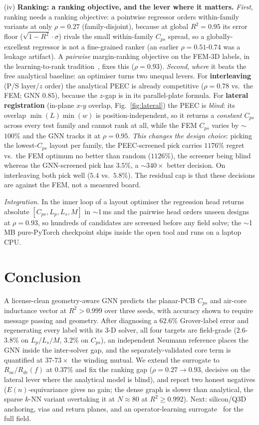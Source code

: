 \documentclass[letterpaper,twocolumn,9pt]{extarticle}
\begin{document}
(iv) \textbf{Ranking: a ranking objective, and the lever where it matters.}
\emph{First}, ranking needs a ranking objective: a pointwise regressor orders
within-family variants at only $\rho=0.27$ (family-disjoint), because at global
$R^2=0.95$ its error floor ($\sqrt{1-R^2}\cdot\sigma$) rivals the small
within-family $C_{ps}$ spread, so a globally-excellent regressor is not a
fine-grained ranker (an earlier $\rho=0.51$-$0.74$ was a leakage artifact). A
\emph{pairwise} margin-ranking objective on the FEM-3D labels, in the
learning-to-rank tradition~\cite{ranknet,lambdamart}, fixes this ($\rho=0.93$).
\emph{Second}, \emph{where} it beats the free analytical baseline: an optimiser
turns two unequal levers. For \textbf{interleaving} (P/S layer/$z$ order) the
analytical PEEC is already competitive ($\rho=0.78$ vs.\ the FEM; GNN $0.85$),
because the $z$-gap is in its parallel-plate formula. For \textbf{lateral
registration} (in-plane $x$-$y$ overlap, Fig.~\ref{fig:lateral}) the PEEC is
\emph{blind}: its overlap $\min(L)\min(w)$ is position-independent, so it returns
a \emph{constant} $C_{ps}$ across every test family and cannot rank at all, while
the FEM $C_{ps}$ varies by $\sim$$100\%$ and the GNN tracks it at $\rho=0.95$.
\emph{This changes the design choice}: picking the lowest-$C_{ps}$ layout per
family, the PEEC-screened pick carries $1176\%$ regret vs.\ the FEM optimum no
better than random ($1126\%$), the screener being blind whereas the
GNN-screened pick has $3.5\%$, a $\sim$$340\times$ better decision. On
interleaving both pick well ($5.4$ vs.\ $5.8\%$). The residual cap is that these
decisions are against the FEM, not a measured board.

\emph{Integration.} In the inner loop of a layout optimiser the regression head
returns absolute $[C_{ps},L_p,L_s,M]$ in $\sim$1\,ms and the pairwise head orders
unseen designs at $\rho=0.93$, so hundreds of candidates are screened before any
field solve; the $\sim$1\,MB pure-PyTorch checkpoint ships inside the open tool
and runs on a laptop CPU.

\section{Conclusion}
A license-clean geometry-aware GNN predicts the planar-PCB $C_{ps}$ and air-core
inductance vector at $R^2>0.999$ over three seeds, with accuracy shown to require message
passing and geometry. After diagnosing a $62.6\%$ Grover-label error and
regenerating every label with its 3-D solver, all four targets are field-grade
($2.6$-$3.8\%$ on $L_p/L_s/M$, $3.2\%$ on $C_{ps}$), an independent Neumann
reference places the GNN inside the inter-solver gap, and the separately-validated
core term is quantified at $37$-$73\times$ the winding mutual. We extend the
surrogate to $R_{ac}/R_{dc}(f)$ at $0.37\%$ and fix the ranking gap ($\rho=0.27
\rightarrow 0.93$, decisive on the lateral lever where the analytical model is
blind), and report two honest negatives ($E(n)$-equivariance gives no gain; the
dense graph is slower than analytical, the sparse $k$-NN variant overtaking it at
$N\!\approx\!80$ at $R^2\ge0.992$). Next: silicon/Q3D anchoring, vias and return
planes, and an operator-learning surrogate~\cite{fno,deeponet} for the full field.
\end{document}
